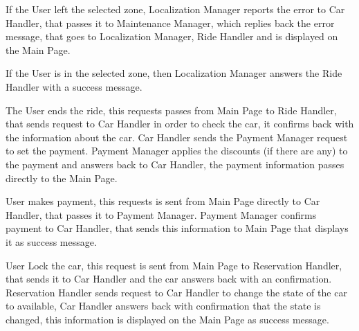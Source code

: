 		If the User left the selected zone, Localization Manager reports the error to Car Handler, that passes it to Maintenance Manager, which replies back the error message, that goes to Localization Manager, Ride Handler and is displayed on the Main Page.
		
		If the User is in the selected zone, then Localization Manager answers the Ride Handler with a success message.  
		
		The User ends the ride, this requests passes from Main Page to Ride Handler, that sends request to Car Handler in order to check the car,   it confirms back with the information about the car. Car Handler sends the Payment Manager request to set the payment. Payment Manager applies the discounts (if there are any) to the payment and answers back to Car Handler, the payment information passes directly to the Main Page. 
		
		User makes payment, this requests is sent from Main Page directly to Car Handler, that passes it to Payment Manager. Payment Manager confirms payment to Car Handler, that sends this information to Main Page that displays it as success message.
		
		User Lock the car, this request is sent from Main Page to Reservation Handler, that sends it to Car Handler and the car answers back with an confirmation. Reservation Handler sends request to Car Handler to change the state of the car to available, Car Handler answers back with confirmation that the state is changed, this information is displayed on the Main Page as success message.    
